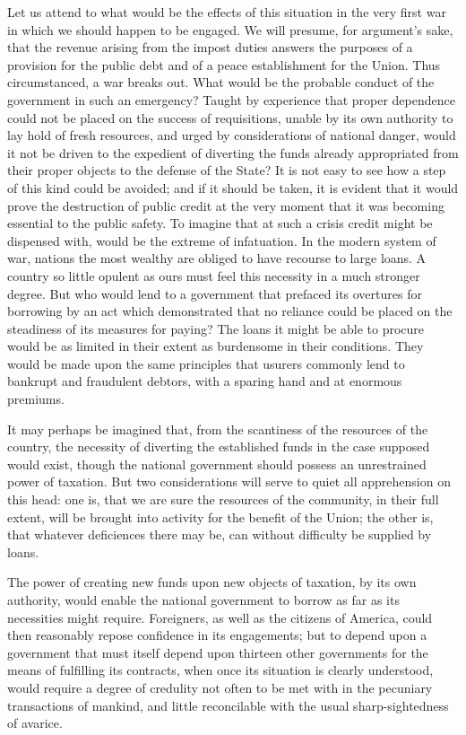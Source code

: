 Let us attend to what would be the effects of this situation in the very first war in which we should happen to be engaged. 
We will presume, for argument's sake, that the revenue arising from the impost duties answers the purposes of a provision for the public debt and of a peace establishment for the Union. 
Thus circumstanced, a war breaks out. 
What would be the probable conduct of the government in such an emergency? 
Taught by experience that proper dependence could not be placed on the success of requisitions, unable by its own authority to lay hold of fresh resources, and urged by considerations of national danger, would it not be driven to the expedient of diverting the funds already appropriated from their proper objects to the defense of the State? 
It is not easy to see how a step of this kind could be avoided; and if it should be taken, it is evident that it would prove the destruction of public credit at the very moment that it was becoming essential to the public safety. 
To imagine that at such a crisis credit might be dispensed with, would be the extreme of infatuation. 
In the modern system of war, nations the most wealthy are obliged to have recourse to large loans. 
A country so little opulent as ours must feel this necessity in a much stronger degree. 
But who would lend to a government that prefaced its overtures for borrowing by an act which demonstrated that no reliance could be placed on the steadiness of its measures for paying? 
The loans it might be able to procure would be as limited in their extent as burdensome in their conditions. 
They would be made upon the same principles that usurers commonly lend to bankrupt and fraudulent debtors, with a sparing hand and at enormous premiums.

It may perhaps be imagined that, from the scantiness of the resources of the country, the necessity of diverting the established funds in the case supposed would exist, though the national government should possess an unrestrained power of taxation. 
But two considerations will serve to quiet all apprehension on this head: one is, that we are sure the resources of the community, in their full extent, will be brought into activity for the benefit of the Union; the other is, that whatever deficiences there may be, can without difficulty be supplied by loans.

The power of creating new funds upon new objects of taxation, by its own authority, would enable the national government to borrow as far as its necessities might require. 
Foreigners, as well as the citizens of America, could then reasonably repose confidence in its engagements; but to depend upon a government that must itself depend upon thirteen other governments for the means of fulfilling its contracts, when once its situation is clearly understood, would require a degree of credulity not often to be met with in the pecuniary transactions of mankind, and little reconcilable with the usual sharp-sightedness of avarice.


